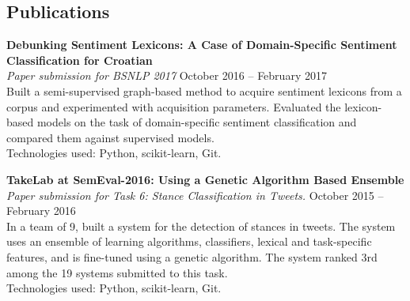 \documentclass[margin,line]{resume}
\begin{document}
\begin{resume}



\vspace{1mm}
\section{\mysidestyle Publications}

\textbf{Debunking Sentiment Lexicons: A Case of Domain-Specific Sentiment Classification for Croatian} \vspace{1mm}\\\vspace{1mm}%
\textsl{Paper submission for BSNLP 2017} \hfill October 2016 -- February 2017\\%
Built a semi-supervised graph-based method to acquire sentiment lexicons from a corpus and experimented with acquisition parameters. Evaluated the lexicon-based models on the task of domain-specific sentiment classification and compared them against supervised models.
 \\
Technologies used: Python, scikit-learn, Git.

\textbf{TakeLab at SemEval-2016: Using a Genetic Algorithm Based Ensemble} \vspace{1mm}\\\vspace{1mm}%
\textsl{Paper submission for Task 6: Stance Classification in Tweets.} \hfill October 2015 -- February 2016\\%
In a team of 9, built a system for the detection of stances in tweets. The system uses an ensemble of learning algorithms, classifiers, lexical and task-specific features, and is fine-tuned using a genetic algorithm. The system ranked 3rd among the 19 systems submitted to this task. \\
Technologies used: Python, scikit-learn, Git.


\end{resume}
\end{document}
